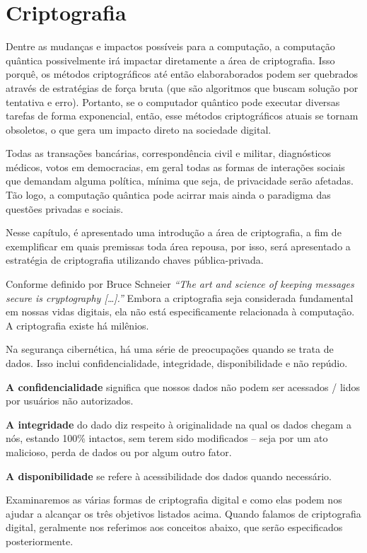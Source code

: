 \section{Criptografia}
Dentre as mudanças e impactos possíveis para a computação, a computação quântica possivelmente irá impactar diretamente a área de criptografia. Isso porquê, os métodos criptográficos até então elaboraborados podem ser quebrados através de estratégias de força bruta (que são algoritmos que buscam solução por tentativa e erro). Portanto, se o computador quântico pode executar diversas tarefas de forma exponencial, então, esse métodos criptográficos atuais se tornam obsoletos, o que gera um impacto direto na sociedade digital.

Todas as transações bancárias, correspondência civil e militar, diagnósticos médicos, votos em democracias, em geral todas as formas de interações sociais que demandam alguma política, mínima que seja, de privacidade serão afetadas. Tão logo, a computação quântica pode acirrar mais ainda o paradigma das questões privadas e sociais.

Nesse capítulo, é apresentado uma introdução a área de criptografia, a fim de exemplificar em quais premissas toda área repousa, por isso, será apresentado a estratégia de criptografia utilizando chaves pública-privada.

Conforme definido por Bruce Schneier \textit{``The art and science of keeping messages secure is cryptography […].''} \cite{13} Embora a criptografia seja considerada fundamental em nossas vidas digitais, ela não está especificamente relacionada à computação. A criptografia existe há milênios.

Na segurança cibernética, há uma série de preocupações quando se trata de dados. Isso inclui confidencialidade, integridade, disponibilidade e não repúdio.

\textbf{A confidencialidade} significa que nossos dados não podem ser acessados / lidos por usuários não autorizados.

\textbf{A integridade} do dado diz respeito à originalidade na qual os dados chegam a nós, estando 100\% intactos, sem terem sido modificados – seja por um ato malicioso, perda de dados ou por algum outro fator. 

\textbf{A disponibilidade} se refere à acessibilidade dos dados quando necessário.

Examinaremos as várias formas de criptografia digital e como elas podem nos ajudar a alcançar os três objetivos listados acima. Quando falamos de criptografia digital, geralmente nos referimos aos conceitos abaixo, que serão especificados posteriormente.

